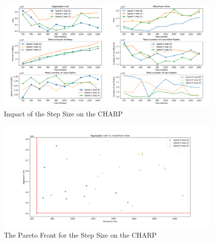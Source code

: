 	\begin{figure}[h!]
		\centering
		\includegraphics[width=\textwidth]{figures/speed5Step.png}
		\caption[]{Impact of the Step Size on the CHARP}
		\label{fig:costTimeStep}
	\end{figure}

	\begin{figure}[h!]
		\centering
		\includegraphics[width=\textwidth]{figures/costTimeStep.png}
		\caption[]{The Pareto Front for the Step Size on the CHARP}
		\label{fig:costTimeStep}
	\end{figure}